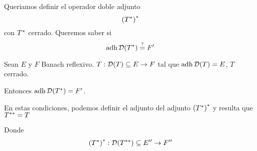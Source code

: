 
\renewcommand{\catnum}{13 (11 No Presencial)}%
\renewcommand{\fecha}{28 de abril de 2020}


Queriamos definir el operador doble adjunto $$
{({T}^{*})}^{*} 
$$ con ${T}^{*}$ cerrado. Queremos saber si $$
\operatorname{\mathop{\text{\upshape{adh}}}} \mathcal{D} ({T}^{*}) \overset{?}{=}  F'
$$

\begin{thm}
Sean $E$ y $F$ Banach reflexivo. $T: \mathcal{D}({T}) \subseteq E \to F$ tal que $\operatorname{\mathop{\text{\upshape{adh}}}} \mathcal{D}(T) = E$, $T$ cerrado.

Entonces $\operatorname{\mathop{\text{\upshape{adh}}}} \mathcal{D} ({T}^{*} ) = F'$.

\end{thm}

En estas condiciones, podemos definir el adjunto del adjunto ${({T}^{*})}^{*}$ y resulta que ${T}^{**} = T$

Donde $$
\deffuncs{
\adjc{(\adjc{T})}
}{\cd(\dadjc{T}) \subseteq E''}{F''}
$$

